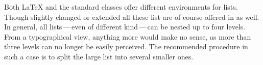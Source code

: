 Both {\LaTeX} and the standard classes offer different environments for
lists. Though slightly changed or extended all these list are of course
offered in {\KOMAScript} as well. In general, all lists\,---\,even of different
kind\,---\,can be nested up to four levels. From a typographical view,
anything more would make no sense, as more than three levels can no longer be
easily perceived. The recommended procedure in such a case is
to split the large list into several smaller ones.


